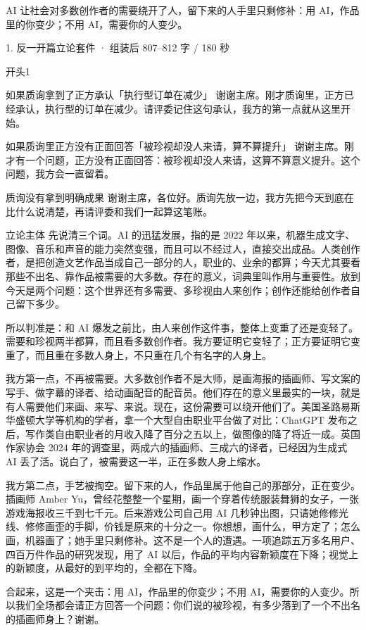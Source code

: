 \documentclass[script,con]{debate}
\begin{document}
\debatetitle
\begin{thesisbox}[全场一句话立论]AI 让社会对多数创作者的需要绕开了人，留下来的人手里只剩修补：用 AI，作品里的你变少；不用 AI，需要你的人变少。\end{thesisbox}

\begin{kit}{1. 反一开篇立论}{套件 · 组装后 807–812 字 / 180 秒}
\begin{pick}{开头}{1}
\begin{module}{如果质询拿到了正方承认「执行型订单在减少」}
谢谢主席。刚才质询里，正方已经承认，执行型的订单在减少。请评委记住这句承认，我方的第一点就从这里开始。
\end{module}
\begin{module}{如果质询里正方没有正面回答「被珍视却没人来请，算不算提升」}
谢谢主席。刚才有一个问题，正方没有正面回答：被珍视却没人来请，这算不算意义提升。这个问题，我方会一直留着。
\end{module}
\begin{fallback}{质询没有拿到明确成果}
谢谢主席，各位好。质询先放一边，我方先把今天到底在比什么说清楚，再请评委和我们一起算这笔账。
\end{fallback}
\end{pick}
\begin{fixed}{立论主体}
先说清三个词。AI 的迅猛发展，指的是 2022 年以来，机器生成文字、图像、音乐和声音的能力突然变强，而且可以不经过人，直接交出成品。人类创作者，是把创造文艺作品当成自己一部分的人，职业的、业余的都算；今天尤其要看那些不出名、靠作品被需要的大多数。存在的意义，词典里叫作用与重要性。放到今天是两个问题：这个世界还有多需要、多珍视由人来创作；创作还能给创作者自己留下多少。

所以判准是：和 AI 爆发之前比，由人来创作这件事，整体上变重了还是变轻了。需要和珍视两半都算，而且看多数创作者。我方要证明它变轻了；正方要证明它变重了，而且重在多数人身上，不只重在几个有名字的人身上。

我方第一点，不再被需要。大多数创作者不是大师，是画海报的插画师、写文案的写手、做字幕的译者、给动画配音的配音员。他们存在的意义里最实的一块，就是有人需要他们来画、来写、来说。现在，这份需要可以绕开他们了。美国圣路易斯华盛顿大学等机构的学者，拿一个大型自由职业平台做了对比：ChatGPT 发布之后，写作类自由职业者的月收入降了百分之五以上，做图像的降了将近一成。英国作家协会 2024 年的调查里，两成六的插画师、三成六的译者，已经因为生成式 AI 丢了活。说白了，被需要这一半，正在多数人身上缩水。

我方第二点，手艺被掏空。留下来的人，作品里属于他自己的那部分，正在变少。插画师 Amber Yu，曾经花整整一个星期，画一个穿着传统服装舞狮的女子，一张游戏海报收三千到七千元。后来游戏公司自己用 AI 几秒钟出图，只请她修修光线、修修画歪的手脚，价钱是原来的十分之一。你想想，画什么，甲方定了；怎么画，机器画了；她手里只剩修补。这不是一个人的遭遇。一项追踪五万多名用户、四百万件作品的研究发现，用了 AI 以后，作品的平均内容新颖度在下降；视觉上的新颖度，从最好的到平均的，全都在下降。

合起来，这是一个夹击：用 AI，作品里的你变少；不用 AI，需要你的人变少。所以我们全场都会请正方回答一个问题：你们说的被珍视，有多少落到了一个不出名的插画师身上？谢谢。
\end{fixed}
\end{kit}
\end{document}
